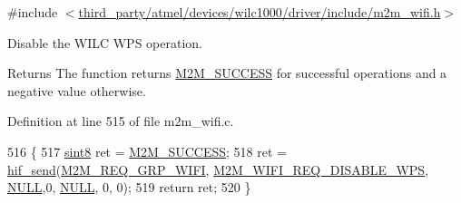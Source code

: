 {\ttfamily \#include $<$\hyperlink{m2m__wifi_8h}{third\+\_\+party/atmel/devices/wilc1000/driver/include/m2m\+\_\+wifi.\+h}$>$}



Disable the W\+I\+LC W\+PS operation. 

\begin{DoxyReturn}{Returns}
The function returns \hyperlink{nm__common_8h_a9ef27ba27aafdd1aa3a79d3ba2c36b8f}{M2\+M\+\_\+\+S\+U\+C\+C\+E\+SS} for successful operations and a negative value otherwise. 
\end{DoxyReturn}


Definition at line 515 of file m2m\+\_\+wifi.\+c.


\begin{DoxyCode}
516 \{
517     \hyperlink{group__DataT_gae35f10ffd0ac8dd2bc3e794da9bdfbc7}{sint8} ret = \hyperlink{nm__common_8h_a9ef27ba27aafdd1aa3a79d3ba2c36b8f}{M2M\_SUCCESS};
518     ret = \hyperlink{m2m__hif_8c_a13ba8ad11b2ac39516ca787386d16ce0}{hif\_send}(\hyperlink{nm__common_8h_a9ab02eb1aea02a75c3f5aade4eef1276aeb9a7d57324ba4b8a6c2a5f46dd499c2}{M2M\_REQ\_GRP\_WIFI}, 
      \hyperlink{group__WlanEnums_gga064de09dec1d5e88ed8d075fa40f57deaccedcdbffb3ee39d0567a7eacafcc156}{M2M\_WIFI\_REQ\_DISABLE\_WPS}, \hyperlink{group__BSPDefine_ga070d2ce7b6bb7e5c05602aa8c308d0c4}{NULL},0, \hyperlink{group__BSPDefine_ga070d2ce7b6bb7e5c05602aa8c308d0c4}{NULL}, 0, 0);
519     \textcolor{keywordflow}{return} ret;
520 \}
\end{DoxyCode}
